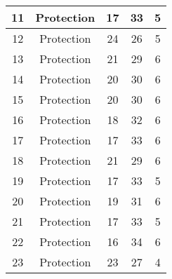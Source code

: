 \documentclass[results.tex]{subfiles}
\begin{document}
\begin{center}
\begin{tabular}{| c || c | c | c | c |}
            \hline
            11                      & Protection                   & 17                     & 33                      & 5                    \\
            \hline
            12                      & Protection                   & 24                     & 26                      & 5                    \\
            \hline
            13                      & Protection                   & 21                     & 29                      & 6                    \\
            \hline
            14                      & Protection                   & 20                     & 30                      & 6                    \\
            \hline
            15                      & Protection                   & 20                     & 30                      & 6                    \\
            \hline
            16                      & Protection                   & 18                     & 32                      & 6                    \\
            \hline
            17                      & Protection                   & 17                     & 33                      & 6                    \\
            \hline
            18                      & Protection                   & 21                     & 29                      & 6                    \\
            \hline
            19                      & Protection                   & 17                     & 33                      & 5                    \\
            \hline
            20                      & Protection                   & 19                     & 31                      & 6                    \\
            \hline
            21                      & Protection                   & 17                     & 33                      & 5                    \\
            \hline
            22                      & Protection                   & 16                     & 34                      & 6                    \\
            \hline
            23                      & Protection                   & 23                     & 27                      & 4                    \\

\end{tabular}
\end{center}
\end{document}
